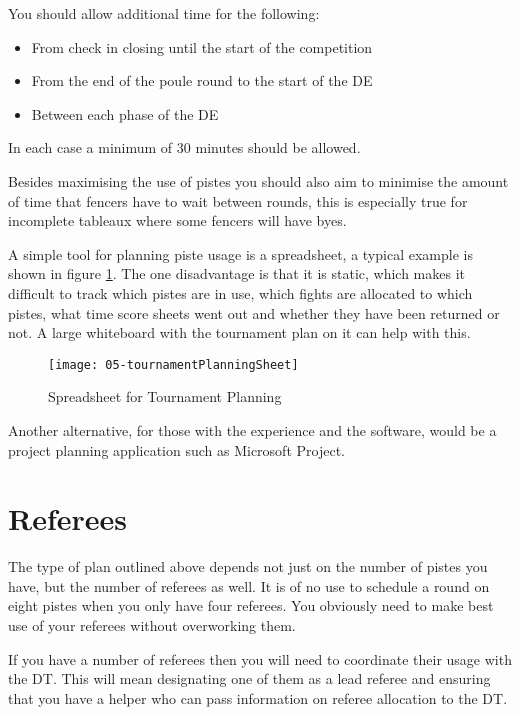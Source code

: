 \documentclass[a4paper,11pt]{memoir}
\begin{document}
You should allow additional time for the following:

\begin{itemize}
 \item From check in closing until the start of the competition
 \item From the end of the poule round to the start of the DE
 \item Between each phase of the DE
\end{itemize}

In each case a minimum of 30 minutes should be allowed.

Besides maximising the use of pistes you should also aim to minimise the amount of time that fencers have to wait between rounds, this is especially true for incomplete tableaux where some fencers will have byes.

A simple tool for planning piste usage is a spreadsheet, a typical example is shown in figure \ref{fig:05-tournamentPlanningSheet}. The one disadvantage is that it is static, which makes it difficult to track which pistes are in use, which fights are allocated to which pistes, what time score sheets went out and whether they have been returned or not. A large whiteboard with the tournament plan on it can help with this.

\begin{figure}[!ht]
 \centering
 \texttt{[image: 05-tournamentPlanningSheet]}
 \caption{Spreadsheet for Tournament Planning} \label{fig:05-tournamentPlanningSheet}
\end{figure}

Another alternative, for those with the experience and the software, would be a project planning application such as Microsoft Project.

\section{Referees}

The type of plan outlined above depends not just on the number of pistes you have, but the number of referees as well. It is of no use to schedule a round on eight pistes when you only have four referees. You obviously need to make best use of your referees without overworking them.

If you have a number of referees then you will need to coordinate their usage with the DT. This will mean designating one of them as a lead referee and ensuring that you have a helper who can pass information on referee allocation to the DT.
\end{document}

